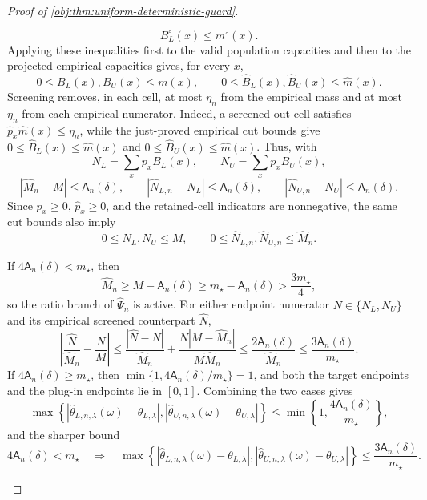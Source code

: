 \documentclass[11pt]{article}
\begin{document}
\begin{proof}[Proof of \cref{obj:thm:uniform-deterministic-guard}]
\begin{enumerate}
\[
B_L^\circ(x)\le m^\circ(x).
\]
Applying these inequalities first to the valid population capacities and then
to the projected empirical capacities gives, for every \(x\),
\[
0\le B_L(x),B_U(x)\le m(x),
\qquad
0\le \widehat B_L(x),\widehat B_U(x)\le \widehat m(x).
\]
Screening removes, in each cell, at most \(\eta_n\) from the empirical mass and
at most \(\eta_n\) from each empirical numerator.  Indeed, a screened-out cell
satisfies \(\widehat p_x\widehat m(x)\le\eta_n\), while the just-proved
empirical cut bounds give
\(0\le \widehat B_L(x)\le\widehat m(x)\) and
\(0\le\widehat B_U(x)\le\widehat m(x)\).  Thus, with
\[
N_L=\sum_x p_xB_L(x),
\qquad
N_U=\sum_x p_xB_U(x),
\]
\[
\left|\widehat M_n-M\right|\le \mathsf A_n(\delta),
\qquad
\left|\widehat N_{L,n}-N_L\right|\le \mathsf A_n(\delta),
\qquad
\left|\widehat N_{U,n}-N_U\right|\le \mathsf A_n(\delta).
\]
Since \(p_x\ge0\), \(\widehat p_x\ge0\), and the retained-cell indicators are
nonnegative, the same cut bounds also imply
\[
0\le N_L,N_U\le M,
\qquad
0\le\widehat N_{L,n},\widehat N_{U,n}\le\widehat M_n.
\]

If \(4\mathsf A_n(\delta)<m_\star\), then
\[
\widehat M_n
\ge
M-\mathsf A_n(\delta)
\ge
m_\star-\mathsf A_n(\delta)
>
\frac{3m_\star}{4},
\]
so the ratio branch of \(\widehat\Psi_n\) is active.  For either endpoint
numerator \(N\in\{N_L,N_U\}\) and its empirical screened counterpart
\(\widehat N\),
\[
\left|
\frac{\widehat N}{\widehat M_n}-\frac{N}{M}
\right|
\le
\frac{|\widehat N-N|}{\widehat M_n}
+
\frac{N|M-\widehat M_n|}{M\widehat M_n}
\le
\frac{2\mathsf A_n(\delta)}{\widehat M_n}
\le
\frac{3\mathsf A_n(\delta)}{m_\star}.
\]
If \(4\mathsf A_n(\delta)\ge m_\star\), then
\(\min\{1,4\mathsf A_n(\delta)/m_\star\}=1\), and both the target endpoints and
the plug-in endpoints lie in \([0,1]\).  Combining the two cases gives
\[
\max\left\{
\left|\widehat\theta_{L,n,\lambda}(\omega)-\theta_{L,\lambda}\right|,
\left|\widehat\theta_{U,n,\lambda}(\omega)-\theta_{U,\lambda}\right|
\right\}
\le
\min\left\{1,\frac{4\mathsf A_n(\delta)}{m_\star}\right\},
\]
and the sharper bound
\[
4\mathsf A_n(\delta)<m_\star
\quad\Longrightarrow\quad
\max\left\{
\left|\widehat\theta_{L,n,\lambda}(\omega)-\theta_{L,\lambda}\right|,
\left|\widehat\theta_{U,n,\lambda}(\omega)-\theta_{U,\lambda}\right|
\right\}
\le
\frac{3\mathsf A_n(\delta)}{m_\star}.
\]


\end{enumerate}
\end{proof}
\end{document}
